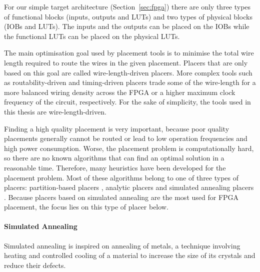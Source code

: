 \documentclass[a4paper,oneside,12pt]{article}
\begin{document}
For our simple target architecture (Section~\ref{sec:fpga}) there are only three types of functional blocks (inputs, outputs and LUTs) and two types of physical blocks (IOBs and LUTs). The inputs and the outputs can be placed on the IOBs while the functional LUTs can be placed on the physical LUTs.

The main optimisation goal used by placement tools is to minimise the total wire length required to route the wires in the given placement. Placers that are only based on this goal are called wire-length-driven placers. More complex tools such as routability-driven \cite{swartz1998afrrff} and timing-driven placers \cite{marquardt2000tpff} trade some of the wire-length for
a more balanced wiring density across the FPGA or a higher maximum clock frequency of the circuit, respectively. For the sake of simplicity, the tools used in this thesis are wire-length-driven.

Finding a high quality placement is very important, because poor  quality placements generally cannot be routed or lead to low operation frequencies and high power consumption. Worse, the placement problem is computationally hard, so there are no known algorithms that can find an optimal solution in a reasonable time. Therefore, many heuristics have been developed for the placement problem. Most of these algorithms belong to one of three types of placers: partition-based placers \cite{maidee2005tppfisf}, analytic placers \cite{chan2003ppffga} and simulated annealing placers \cite{betz1997vanppartffr}. Because placers based on simulated annealing are the most used for FPGA placement, the focus lies on this type of placer below.

\paragraph{Simulated Annealing}
Simulated annealing \cite{kirkpatrick1983obsa} is inspired on annealing of metals, a technique involving heating and controlled cooling of a material to increase the size of its crystals and reduce their defects.
\end{document}
